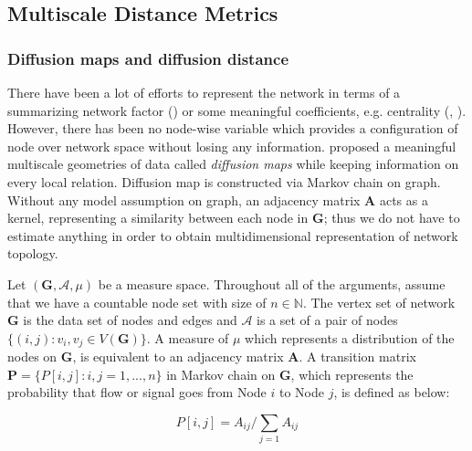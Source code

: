 \documentclass[12pt]{article}
\theoremstyle{definition}
\begin{document}
	
\subsection{Multiscale Distance Metrics}	


\subsubsection{Diffusion maps and diffusion distance}
	
There have been a lot of efforts to represent the network in terms of a summarizing network factor (\cite{hoff2002latent}) or some meaningful coefficients, e.g. centrality (\cite{mantzaris2013dynamic}, \cite{sporns2007identification}). However, there has been no node-wise variable which provides a configuration of node over network space without losing any information. \cite{coifman2006diffusion} proposed a meaningful multiscale geometries of data called \textit{diffusion maps} while keeping information on every local relation. Diffusion map is constructed via Markov chain on graph. Without any model assumption on graph, an adjacency matrix $\boldsymbol{A}$ acts as a kernel, representing a similarity between each node in $\boldsymbol{G}$; thus we do not have to estimate anything in order to obtain multidimensional representation of network topology. 
	
Let $(\boldsymbol{G}, \mathcal{A}, \mu)$ be a measure space. Throughout all of the arguments, assume that we have a countable node set with size of $n \in \mathbb{N}$. The vertex set of network $\boldsymbol{G}$ is the data set of nodes and edges and $\mathcal{A}$ is a set of a pair of nodes $\{(i,j) : v_{i}, v_{j} \in V(\boldsymbol{G}) \}$. A measure of $\mu$ which represents a distribution of the nodes on $\boldsymbol{G}$, is equivalent to an adjacency matrix $\boldsymbol{A}$. A transition matrix $\mathbf{P} = \{P[i,j] : i,j=1,...,n \}$ in Markov chain on $\boldsymbol{G}$, which represents the probability that flow or signal goes from Node $i$ to Node $j$, is defined as below:
	
\begin{equation}
P[i,j] = A_{ij} \big/ \sum\limits_{j=1} A_{ij}
\end{equation}
	
\end{document}
